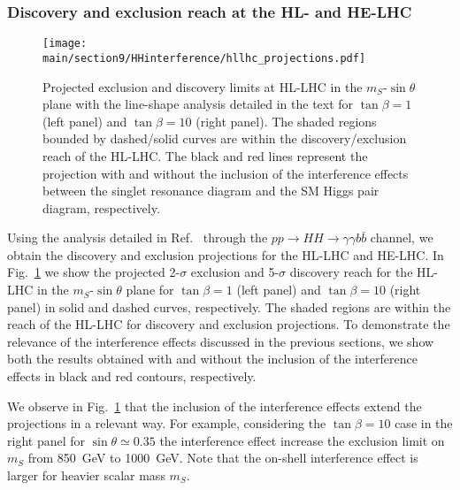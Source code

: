 \subsubsection*{Discovery and exclusion reach at the HL- and HE-LHC} 

\begin{figure}[t]
  \centering
  \texttt{[image: \\main/section9/HHinterference/hllhc\_projections.pdf]}
  \caption{Projected exclusion and discovery limits at HL-LHC in the $m_S$-$\sin\theta$ plane with the line-shape analysis detailed in the text for $\tan\beta=1$ (left panel) and $\tan\beta=10$ (right panel). The shaded regions bounded by dashed/solid curves are within the discovery/exclusion reach of the HL-LHC. The black and red lines represent the projection with and without the inclusion of the interference effects between the singlet resonance diagram and the SM Higgs pair diagram, respectively.
  }
  \label{fig:HLprojection}
\end{figure} 

Using the analysis detailed in Ref.~\cite{Carena:2018vpt} through the $pp\to HH \to \gamma\gamma b\bar b$ channel, we obtain the discovery and exclusion projections for the HL-LHC and HE-LHC.
In Fig.~\ref{fig:HLprojection} we show the projected 2-$\sigma$ exclusion and 5-$\sigma$ discovery reach for the HL-LHC in the $m_S$-$\sin\theta$ plane for $\tan\beta=1$ (left panel) and $\tan\beta=10$ (right panel) in solid and dashed curves, respectively. The shaded regions are within the reach of the HL-LHC for discovery and exclusion projections. To demonstrate the relevance of the interference effects discussed in the previous sections, we show both the results obtained with and without the inclusion of the interference effects in black and red contours, respectively. 

We observe in Fig.~\ref{fig:HLprojection} that the inclusion of the interference effects extend the projections in a relevant way. For example, considering the $\tan\beta=10$ case in the right panel for $\sin\theta\simeq 0.35$ the interference effect increase the exclusion limit on $m_S$ from 850~GeV to 1000~GeV.
Note that the on-shell interference effect is larger for heavier scalar mass $m_S$. 

